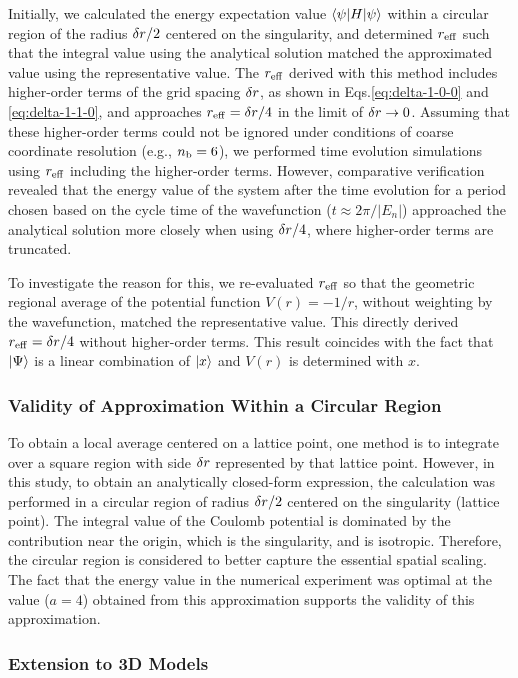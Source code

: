 \documentclass[jctc-draft.tex]{subfiles}
\begin{document}
Initially, we calculated the energy expectation value $\braket{\psi|H|\psi}$
within a circular region of the radius $\delta r/2$ centered on the singularity,
and determined $r_{\mathrm{eff}}$ such that the integral value using the analytical
solution matched the approximated value using the representative value. The
$r_{\mathrm{eff}}$ derived with this method includes higher-order terms of the grid spacing
$\delta r$, as shown in Eqs.\eqref{eq:delta-1-0-0} and \eqref{eq:delta-1-1-0},
and approaches $r_{\mathrm{eff}}=\delta r/4$ in the limit of $\delta r\rightarrow0$. Assuming
that these higher-order terms could not be ignored under conditions of coarse
coordinate resolution (e.g., $n_{\mathrm{b}}=6$), we performed time evolution simulations
using $r_{\mathrm{eff}}$ including the higher-order terms. However, comparative
verification revealed that the energy value of the system after the time
evolution for a period chosen based on the cycle time of the wavefunction
($t\approx 2\pi/|E_n|$) approached the analytical solution more closely when
using $\delta r/4$, where higher-order terms are truncated.

To investigate the reason for this, we re-evaluated $r_{\mathrm{eff}}$ so that the
geometric regional average of the potential function $V(r)=-1/r$, without
weighting by the wavefunction, matched the representative value. This directly
derived $r_{\mathrm{eff}}=\delta r/4$ without higher-order terms.  This result coincides
with the fact that $\ket{\Psi}$ is a linear combination of $\ket{x}$ and $V(r)$ is
determined with $x$.

\subsubsection{Validity of Approximation Within a Circular Region}
To obtain a local average centered on a lattice point, one method is to
integrate over a square region with side $\delta r$ represented by that lattice
point. However, in this study, to obtain an analytically closed-form expression,
the calculation was performed in a circular region of radius $\delta r/2$
centered on the singularity (lattice point). The integral value of the Coulomb
potential is dominated by the contribution near the origin, which is the
singularity, and is isotropic. Therefore, the circular region is considered to
better capture the essential spatial scaling. The fact that the energy value in
the numerical experiment was optimal at the value ($a=4$) obtained from this
approximation supports the validity of this approximation.

\subsubsection{Extension to 3D Models}
\label{subsec:discussion-3d-extension}
\end{document}
